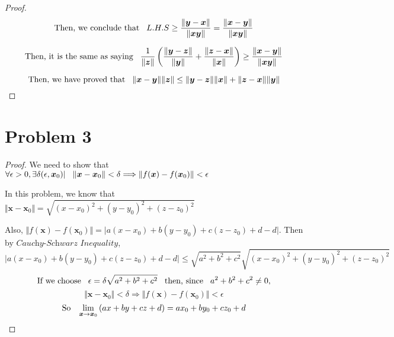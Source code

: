 \documentclass[12pt]{article}
\renewcommand{\vec}[1]{\boldsymbol{#1}}
\begin{document}
\begin{proof}
    \[ \text{Then, we conclude that} \hspace*{0.3cm}
    L.H.S \geq \frac{\Vert \vec y - \vec x \Vert}{\Vert \vec x \vec y
    \Vert} = \frac{\Vert \vec x - \vec y \Vert}{\Vert \vec x \vec y
    \Vert}\]

    \[ \text{Then, it is the same as saying} \hspace*{0.3cm}
    \frac{1}{\Vert \vec z \Vert} 
    \left( \frac{\Vert \vec y - \vec z \Vert}{\Vert \vec y \Vert } + 
    \frac{\Vert \vec z - \vec x \Vert}{ \Vert \vec x \Vert} \right)  \geq
    \frac{\Vert \vec x - \vec y \Vert}{\Vert \vec x \vec y
    \Vert}\]

    \[ \text{Then, we have proved that} \hspace*{0.3cm}
    \Vert \vec x  -  \vec y \Vert \Vert \vec z \Vert \leq
    \Vert \vec y  -  \vec z \Vert \Vert \vec x \Vert + 
    \Vert \vec z  -  \vec x \Vert \Vert \vec y \Vert \]

\end{proof}

\newpage
\section*{Problem 3}
\begin{proof}
We need to show that $\forall \epsilon > 0, \exists \delta(\epsilon, \vec{x}_0)
\vert \hspace*{0.3cm} \Vert \vec x - \vec{x}_0 \Vert < \delta \Longrightarrow \Vert f(\vec x)
- f(\vec x_0) \Vert < \epsilon $

In this problem, we know that $ \Vert \vec x - \vec x_0 \Vert = 
\sqrt{(x-x_0)^2 + (y-y_0)^2 + (z-z_0)^2} $

Also, $ \Vert f(\vec x) - f(\vec x_0) \Vert = \vert a(x-x_0)+b(y-y_0)+c(z-z_0)+d-d \vert $.
 Then by $\textit{Cauchy-Schwarz Inequality}$, 
\[ \vert a(x-x_0)+b(y-y_0)+c(z-z_0) +d-d\vert \leq
\sqrt{a^2+b^2+c^2} \sqrt{(x-x_0)^2+(y-y_0)^2+(z-z_0)^2} \]
\[ \text{If we choose} \hspace*{0.3cm}\epsilon = \delta \sqrt{a^2+b^2+c^2}
\hspace*{0.3cm} \text{then, since} \hspace*{0.3cm} a^2+b^2+c^2 \neq 0,\]
\[ \Vert \vec x - \vec{x}_0 \Vert < \delta \Longrightarrow \Vert f(\vec x)
- f(\vec x_0) \Vert < \epsilon \]
\[ \text{So} \hspace*{0.3cm} \lim_{\vec x \rightarrow \vec x_0}
\left( ax+by+cz+d \right) = ax_0+by_0+cz_0+d \]
    
\end{proof}
\end{document}
